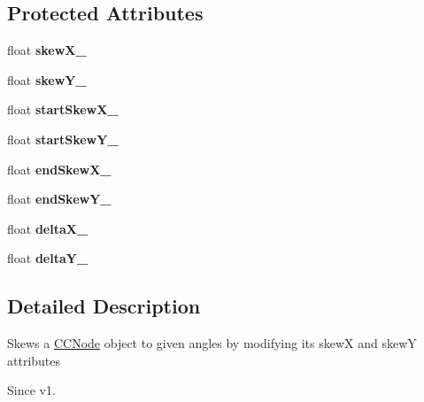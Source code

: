 \subsection*{Protected Attributes}
\begin{DoxyCompactItemize}
\item 
\hypertarget{interface_c_c_skew_to_a2b0cbddce3c75f3ddc4ab30f3230317a}{float {\bfseries skew\-X\-\_\-}}\label{interface_c_c_skew_to_a2b0cbddce3c75f3ddc4ab30f3230317a}

\item 
\hypertarget{interface_c_c_skew_to_a022df4d66d39d440c33ad666ce946cc9}{float {\bfseries skew\-Y\-\_\-}}\label{interface_c_c_skew_to_a022df4d66d39d440c33ad666ce946cc9}

\item 
\hypertarget{interface_c_c_skew_to_a0d4e3dda8a3b766c147f273842287672}{float {\bfseries start\-Skew\-X\-\_\-}}\label{interface_c_c_skew_to_a0d4e3dda8a3b766c147f273842287672}

\item 
\hypertarget{interface_c_c_skew_to_a574554a79a4e335eb50a31c706c03866}{float {\bfseries start\-Skew\-Y\-\_\-}}\label{interface_c_c_skew_to_a574554a79a4e335eb50a31c706c03866}

\item 
\hypertarget{interface_c_c_skew_to_aad60393fc7482a1b20935690f89c2d59}{float {\bfseries end\-Skew\-X\-\_\-}}\label{interface_c_c_skew_to_aad60393fc7482a1b20935690f89c2d59}

\item 
\hypertarget{interface_c_c_skew_to_a26a41011403d4563a5cf94170102d1e1}{float {\bfseries end\-Skew\-Y\-\_\-}}\label{interface_c_c_skew_to_a26a41011403d4563a5cf94170102d1e1}

\item 
\hypertarget{interface_c_c_skew_to_a8f922f125aa33a52fe3e0b6e923f48a4}{float {\bfseries delta\-X\-\_\-}}\label{interface_c_c_skew_to_a8f922f125aa33a52fe3e0b6e923f48a4}

\item 
\hypertarget{interface_c_c_skew_to_a3223d16f79e51de065fa07af64f6f520}{float {\bfseries delta\-Y\-\_\-}}\label{interface_c_c_skew_to_a3223d16f79e51de065fa07af64f6f520}

\end{DoxyCompactItemize}


\subsection{Detailed Description}
Skews a \hyperlink{class_c_c_node}{C\-C\-Node} object to given angles by modifying its skew\-X and skew\-Y attributes \begin{DoxySince}{Since}
v1. 
\end{DoxySince}


